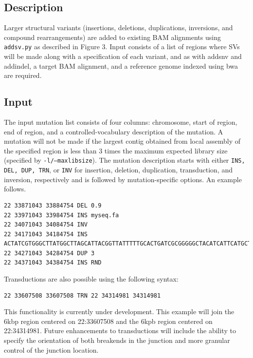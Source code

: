 \documentclass[letterpaper,11pt]{article}
\begin{document}
\begin{verbatim}
\end{verbatim}

\subsection{Description}
   Larger structural variants (insertions, deletions, duplications, inversions, and compound rearrangements) are added to existing BAM alignments using \texttt{addsv.py} as described in Figure 3. Input consists of a list of regions where SVs will be made along with a specification of each variant, and as with addsnv and addindel, a target BAM alignment, and a reference genome indexed using bwa are required.

\subsection{Input}
    The input mutation list consists of four columns: chromosome, start of region, end of region, and a controlled-vocabulary description of the mutation. A mutation will not be made if the largest contig obtained from local assembly of the specified region is less than 3 times the maximum expected library size (specified by \texttt{-l/--maxlibsize}). The mutation description starts with either \texttt{INS, DEL, DUP, TRN}, or \texttt{INV} for insertion, deletion, duplication, transduction, and inversion, respectively and is followed by mutation-specific options. An example follows.

\begin{verbatim}
22 33871043 33884754 DEL 0.9
22 33971043 33984754 INS myseq.fa
22 34071043 34084754 INV
22 34171043 34184754 INS ACTATCGTGGGCTTATGGCTTAGCATTACGGTTATTTTTGCACTGATCGCGGGGGCTACATCATTCATGCTATTACTTGCGTATCGTA
22 34271043 34284754 DUP 3
22 34371043 34384754 INS RND
\end{verbatim}

Transductions are also possible using the following syntax:

\begin{verbatim}
22 33607508 33607508 TRN 22 34314981 34314981
\end{verbatim}

This functionality is currently under development. This example will join the 6kbp region centered on 22:33607508 and the 6kpb region centered on 22:34314981. Future enhancements to transductions will include the ability to specify the orientation of both breakends in the junction and more granular control of the junction location.
\end{document}
